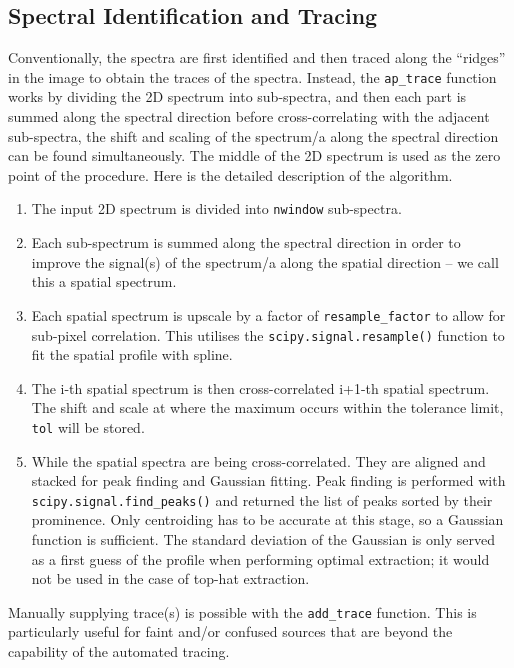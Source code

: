 \documentclass[fleqn,usenatbib]{mnras}
\begin{document}
\subsection{Spectral Identification and Tracing}
\label{sec:tracing}
Conventionally, the spectra are first identified and then traced along
the ``ridges'' in the image to obtain the traces of the spectra.
Instead, the \texttt{ap\_trace} function works by dividing the 2D
spectrum into sub-spectra, and then each part is summed along the
spectral direction before cross-correlating with the adjacent
sub-spectra, the shift and scaling of the spectrum/a along the
spectral direction can be found simultaneously. The middle of the
2D spectrum is used as the zero point of the procedure. Here is the
detailed description of the algorithm.
\begin{enumerate}
    \item
        The input 2D spectrum is divided into \texttt{nwindow}
        sub-spectra.
    \item
        Each sub-spectrum is summed along the spectral direction
        in order to improve the signal(s) of the spectrum/a along
        the spatial direction – we call this a spatial spectrum.
    \item
        Each spatial spectrum is upscale by a factor of
        \texttt{resample\_factor} to allow for sub-pixel correlation.
        This utilises the \texttt{scipy.signal.resample()} function
        to fit the spatial profile with spline.
    \item
        The i-th spatial spectrum is then cross-correlated i+1-th
        spatial spectrum. The shift and scale at where the maximum
        occurs within the tolerance limit, \texttt{tol} will be stored.
    \item
        While the spatial spectra are being cross-correlated. They
        are aligned and stacked for peak finding and Gaussian fitting.
        Peak finding is performed with
        \texttt{scipy.signal.find\_peaks()} and returned the list of
        peaks sorted by their prominence. Only centroiding has to be
        accurate at this stage, so a Gaussian function is sufficient.
        The standard deviation of the Gaussian is only served as a
        first guess of the profile when performing optimal extraction;
        it would not be used in the case of top-hat extraction.
\end{enumerate}

Manually supplying trace(s) is possible with the \texttt{add\_trace}
function. This is particularly useful for faint and/or confused
sources that are beyond the capability of the automated tracing.
\end{document}
